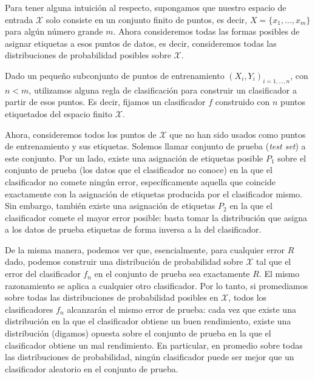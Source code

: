 \documentclass{report}
\begin{document}
Para tener alguna intuición al respecto, supongamos que nuestro espacio de entrada \(\mathcal{X}\) solo consiste en un conjunto finito de puntos, es decir, 
\(X = \{x_1, \dots, x_m\}\) para algún número grande \(m\). Ahora consideremos todas las formas 
posibles de asignar etiquetas a esos puntos de datos, es decir, consideremos todas las distribuciones 
de probabilidad posibles sobre \(\mathcal{X}\). \newline

Dado un pequeño subconjunto de puntos de entrenamiento \((X_i, Y_i)_{i=1,\dots,n}\), con $n<m$, utilizamos 
alguna regla de clasificación para construir un clasificador a partir de esos puntos. Es decir, fijamos un clasificador $f$
construido con $n$ puntos etiquetados del espacio finito \(\mathcal{X}\).\newline

Ahora, consideremos todos los puntos de \(\mathcal{X}\) que no han sido usados como 
puntos de entrenamiento y sus etiquetas. Solemos llamar conjunto de prueba (\textit{test set}) a este conjunto.
Por un lado, existe una asignación de etiquetas posible \(P_1\) sobre el conjunto de prueba (los datos que el clasificador
no conoce) en la que el 
clasificador no comete ningún error, específicamente aquella que coincide exactamente con la asignación 
de etiquetas producida por el clasificador mismo. Sin embargo, también existe una asignación de 
etiquetas \(P_2\) en la que el clasificador comete el mayor error posible: basta tomar la distribución
que asigna a los datos de prueba etiquetas de forma inversa a la del clasificador. \newline

De la misma manera, podemos ver que, esencialmente, para cualquier error \(R\) dado, podemos 
construir una distribución de probabilidad sobre \(\mathcal{X}\) tal que el error del clasificador \(f_n\) en el 
conjunto de prueba sea exactamente \(R\). El mismo razonamiento se aplica a cualquier otro 
clasificador. Por lo tanto, si promediamos sobre todas las distribuciones de probabilidad posibles en \(\mathcal{X}\), 
todos los clasificadores \(f_n\) alcanzarán el mismo error de prueba: cada vez que existe una 
distribución en la que el clasificador obtiene un buen rendimiento, existe una distribución 
(digamos) opuesta sobre el conjunto de prueba en la que el clasificador obtiene un mal rendimiento.
En particular, en promedio sobre todas las distribuciones de probabilidad, ningún 
clasificador puede ser mejor que un clasificador aleatorio en el conjunto de prueba.\newline
\end{document}
